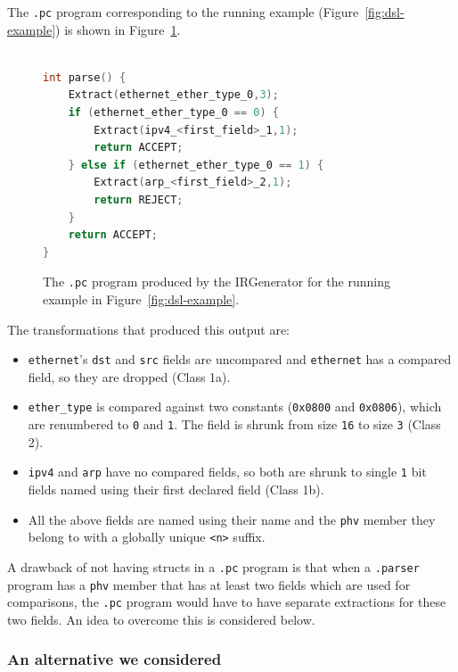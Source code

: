 The \texttt{.pc} program corresponding to the running example
(Figure~\ref{fig:dsl-example}) is shown in Figure~\ref{fig:pc-example}.
\begin{figure}[H]
\centering
\begin{minipage}{0.6\textwidth}
\begin{lstlisting}[style=codeside, language=C]

int parse() {
    Extract(ethernet_ether_type_0,3);
    if (ethernet_ether_type_0 == 0) {
        Extract(ipv4_<first_field>_1,1);
        return ACCEPT;
    } else if (ethernet_ether_type_0 == 1) {
        Extract(arp_<first_field>_2,1);
        return REJECT;
    }
    return ACCEPT;
}
\end{lstlisting}
\end{minipage}
\caption{The \texttt{.pc} program produced by the IRGenerator for the
running example in Figure~\ref{fig:dsl-example}.}
\label{fig:pc-example}
\end{figure}

The transformations that produced this output are:
\begin{itemize}
    \item \texttt{ethernet}'s \texttt{dst} and \texttt{src} fields are
    uncompared and \texttt{ethernet} has a compared field, so they are
    dropped (Class 1a).
    \item \texttt{ether\_type} is compared against two constants
    (\texttt{0x0800} and \texttt{0x0806}), which are renumbered to
    \texttt{0} and \texttt{1}. The field is shrunk from size \texttt{16} to size \texttt{3} (Class 2).
    \item \texttt{ipv4} and \texttt{arp} have no compared fields, so both
    are shrunk to single \texttt{1} bit fields named using their
    first declared field (Class 1b).
    \item All the above fields are named using their name and the \texttt{phv} member they belong to with a globally unique
    \texttt{<n>} suffix.
\end{itemize}

A drawback of not having structs in a \texttt{.pc} program is that when a
\texttt{.parser} program has a \texttt{phv} member that has at least two
fields which are used for comparisons, the \texttt{.pc} program would have
to have separate extractions for these two fields. An idea to overcome this
is considered below.
\subsubsection*{An alternative we considered}

